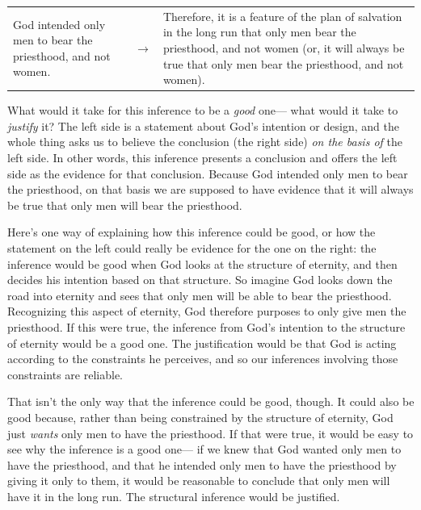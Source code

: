 		\begin{table}[H]
		\centering
		\begin{tabular}{p{7cm}p{0.5cm}p{7cm}}
		God intended only men to bear the priesthood, and not women. & $\rightarrow$ & Therefore, it is a feature of the plan of salvation in the long run that only men bear the priesthood, and not women (or, it will always be true that only men bear the priesthood, and not women).
		\end{tabular}
		\end{table}
		
		What would it take for this inference to be a \textit{good} one---%
			what would it take to \textit{justify} it?
		The left side is a statement about God's intention or design,
			and the whole thing asks us to believe the conclusion (the right side) \textit{on the basis of} the left side.
		In other words,
			this inference presents a conclusion and offers the left side as the evidence for that conclusion.
		Because God intended only men to bear the priesthood,
			on that basis we are supposed to have evidence that it will always be true that only men will bear the priesthood.
			
		Here's one way of explaining how this inference could be good,
			or how the statement on the left could really be evidence for the one on the right:
				the inference would be good when God looks at the structure of eternity,
					and then decides his intention based on that structure.
		So imagine God looks down the road into eternity and sees that only men will be able to bear the priesthood.
		Recognizing this aspect of eternity,
			God therefore purposes to only give men the priesthood.
		If this were true,
			the inference from God's intention to the structure of eternity would be a good one.
		The justification would be that God is acting according to the constraints he perceives,
			and so our inferences involving those constraints are reliable.
			
		That isn't the only way that the inference could be good,
			though. 
		It could also be good because,
			rather than being constrained by the structure of eternity,
				God just \textit{wants} only men to have the priesthood.
		If that were true,
			it would be easy to see why the inference is a good one---%
				if we knew that God wanted only men to have the priesthood,
					and that he intended only men to have the priesthood by giving it only to them,
						it would be reasonable to conclude that only men will have it in the long run.
		The structural inference would be justified.
		
